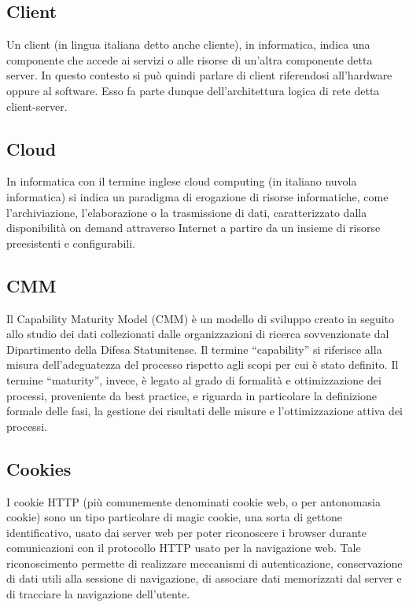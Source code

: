 \subsection*{Client}
Un client (in lingua italiana detto anche cliente), in informatica, indica una componente che accede ai servizi o alle risorse di un'altra componente detta server. In questo contesto si può quindi parlare di client riferendosi all'hardware oppure al software. Esso fa parte dunque dell'architettura logica di rete detta client-server.

\subsection*{Cloud}
In informatica con il termine inglese cloud computing (in italiano nuvola informatica) si indica un paradigma di erogazione di risorse informatiche, come l'archiviazione, l'elaborazione o la trasmissione di dati, caratterizzato dalla disponibilità on demand attraverso Internet a partire da un insieme di risorse preesistenti e configurabili.

\subsection*{CMM}
Il Capability Maturity Model (CMM) è un modello di sviluppo creato in seguito allo
studio dei dati collezionati dalle organizzazioni di ricerca sovvenzionate dal Dipartimento
della Difesa Statunitense. Il termine “capability” si riferisce alla misura dell’adeguatezza
del processo rispetto agli scopi per cui è stato definito. Il termine “maturity”, invece, è
legato al grado di formalità e ottimizzazione dei processi, proveniente da best practice, e
riguarda in particolare la definizione formale delle fasi, la gestione dei risultati delle misure
e l’ottimizzazione attiva dei processi.

\subsection*{Cookies}
I cookie HTTP (più comunemente denominati cookie web, o per antonomasia cookie) sono un tipo particolare di magic cookie, una sorta di gettone identificativo, usato dai server web per poter riconoscere i browser durante comunicazioni con il protocollo HTTP usato per la navigazione web. Tale riconoscimento permette di realizzare meccanismi di autenticazione, conservazione di dati utili alla sessione di navigazione, di associare dati memorizzati dal server e di tracciare la navigazione dell'utente.

